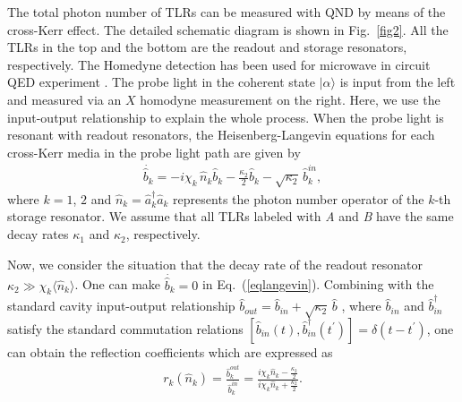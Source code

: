 \documentclass[showpacs,aps,graphicx,twocolumn]{revtex4}
\begin{document}
The total photon number of TLRs can be measured with QND by means of the
cross-Kerr effect. The detailed schematic diagram is shown in
Fig.~\ref{fig2}. All the TLRs in the top and the bottom are the
readout and storage resonators, respectively. The Homedyne detection
has been used for microwave in circuit QED experiment
\cite{RVijaynature}. The probe light in the coherent state
$|\alpha\rangle$ is input from the left and measured via an $X$
homodyne measurement on the right. Here, we use the input-output
relationship to explain the whole process. When the probe light is
resonant with readout resonators, the Heisenberg-Langevin equations
for each cross-Kerr media in the probe light path are given by
\begin{eqnarray}        \label{eqlangevin}
\dot{\hat{b}_{k}}=-i\chi_{k}\,
\hat{n}_{k}\hat{b}_{k}-\frac{\kappa_{2}}{2}\hat{b}_{k}-\sqrt{\kappa_{2}}\,\hat{b}^{in}_{k},
\end{eqnarray}
where $k=1$, $2$ and $\hat{n}_{k}=\hat{a}_{k}^{\dag}\hat{a}_{k}$
represents the photon number operator of the $k$-th storage
resonator. We assume that all TLRs labeled with \emph{A} and
\emph{B} have the same decay rates $\kappa_{1}$ and $\kappa_{2}$,
respectively.





Now, we consider the situation that the decay rate of the readout
resonator $\kappa_{2}\gg \chi_{k}\langle \hat{n}_{k}\rangle$. One
can make $\dot{\hat{b}_{k}}=0$ in Eq.~(\ref{eqlangevin}). Combining
with the standard cavity input-output relationship
$\hat{b}_{out}=\hat{b}_{in}+\sqrt{\kappa_{2}}\,\hat{b}$
\cite{DFWalls,Kevin}, where $\hat{b}_{in}$ and $\hat{b}^{\dag}_{in}$
satisfy the standard commutation relations
$[\hat{b}_{in}(t),\hat{b}^{\dag}_{in}(t^{\prime})]=\delta(t-t^{\prime})$,
one can obtain the reflection coefficients which are expressed as
\begin{eqnarray}        \label{eq4}
r_{k}(\hat{n}_{k})=\frac{\hat{b}^{out}_{k}}{\hat{b}^{in}_{k}}
=\frac{i\chi_{k} \hat{n}_{k}-\frac{\kappa_{2}}{2}}{i\chi_{k}\hat{n}_{k}+\frac{\kappa_{2}}{2}}.
\end{eqnarray}
\end{document}
